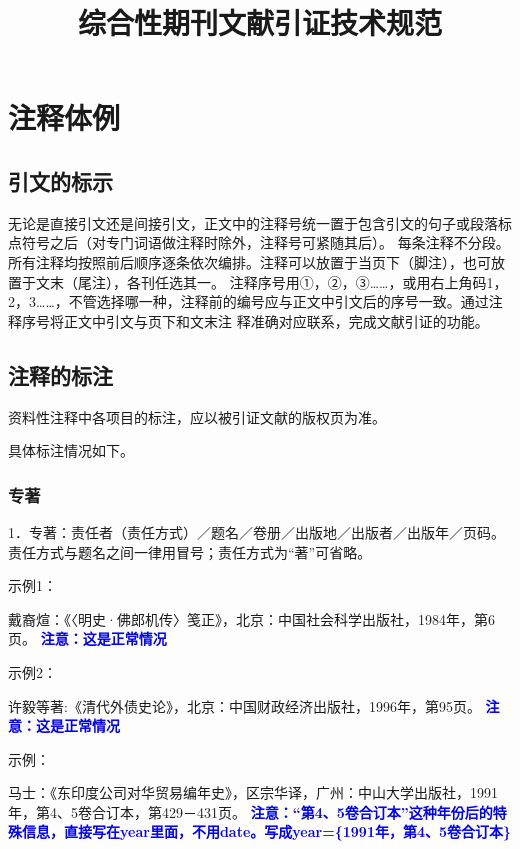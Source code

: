 \documentclass{article}
\newcommand{\qd}[1]{\textbf{\textcolor{blue}{#1}}}
\begin{document}
\title{综合性期刊文献引证技术规范}
\maketitle

\section{注释体例}

\subsection{引文的标示}

无论是直接引文还是间接引文，正文中的注释号统一置于包含引文的句子或段落标点符号之后（对专门词语做注释时除外，注释号可紧随其后）。
每条注释不分段。所有注释均按照前后顺序逐条依次编排。注释可以放置于当页下（脚注），也可放置于文末（尾注），各刊任选其一。
注释序号用①，②，③……，或用右上角码1，2，3……，不管选择哪一种，注释前的编号应与正文中引文后的序号一致。通过注释序号将正文中引文与页下和文末注
释准确对应联系，完成文献引证的功能。

\subsection{注释的标注}

资料性注释中各项目的标注，应以被引证文献的版权页为准。

具体标注情况如下。

\subsubsection{专著}
1．专著：责任者（责任方式）／题名／卷册／出版地／出版者／出版年／页码。责任方式与题名之间一律用冒号；责任方式为“著”可省略。

示例1：

戴裔煊：《〈明史·佛郎机传〉笺正》，北京：中国社会科学出版社，1984年，第6页。
 \qd{注意：这是正常情况}

示例2：

许毅等著:《清代外债史论》，北京：中国财政经济出版社，1996年，第95页。
 \qd{注意：这是正常情况}

示例：

马士：《东印度公司对华贸易编年史》，区宗华译，广州：中山大学出版社，1991年，第4、5卷合订本，第429－431页。
\qd{注意：“第4、5卷合订本”这种年份后的特殊信息，直接写在year里面，不用date。写成year=\{1991年，第4、5卷合订本\}}
\end{document}
